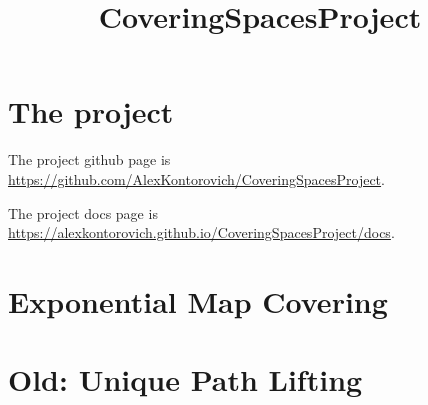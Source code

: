 \usepackage{amsmath, amsthm}
\usepackage{hyperref}

\theoremstyle{definition}
\newtheorem{definition}{Definition}
\newtheorem{theorem}{Theorem}
\newtheorem{proposition}{Proposition}
\newtheorem{lemma}{Lemma}
\newtheorem{corollary}{Corollary}

\title{CoveringSpacesProject}

\newcommand{\eps}{\epsilon}

\newcommand{\R}{\mathbb{R}}
\newcommand{\Q}{\mathbb{Q}}
\newcommand{\C}{\mathbb{C}}
\newcommand{\Z}{\mathbb{Z}}
\newcommand{\N}{\mathbb{N}}



\maketitle

\chapter{The project}

The project github page is \url{https://github.com/AlexKontorovich/CoveringSpacesProject}.

The project docs page is \url{https://alexkontorovich.github.io/CoveringSpacesProject/docs}.

\chapter{Exponential Map Covering}


\chapter{Old: Unique Path Lifting}


%
%


